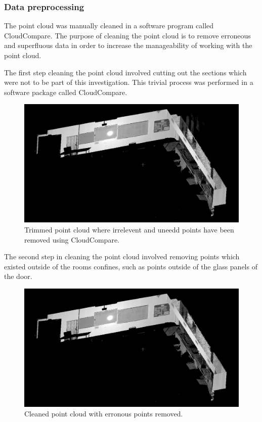 \documentclass[11pt,a4paper]{report}
\begin{document}
			\subsubsection{Data preprocessing}
				The point cloud was manually cleaned in a software program called CloudCompare. The purpose of cleaning the point cloud is to remove erroneous and superfluous data in order to increase the manageability of working with the point cloud.
	
				The first step cleaning the point cloud involved cutting out the sections which were not to be part of this investigation. This trivial process was performed in a software package called CloudCompare.
				
				\begin{figure}[H]
					\centering
					\includegraphics[width=1\textwidth]{trimmed_point_cloud_1}
					\caption[Trimmed point cloud]{Trimmed point cloud where irrelevent and uneedd points have been removed using CloudCompare.}
				\end{figure}
				
				The second step in cleaning the point cloud involved removing points which existed outside of the rooms confines, such as points outside of the glass panels of the door.
				
				\begin{figure}[H]
					\centering
					\includegraphics[width=1\textwidth]{cleaned_point_cloud_1}
					\caption[Cleaned point cloud]{Cleaned point cloud with erronous points removed.}
				\end{figure}
 
\end{document}
